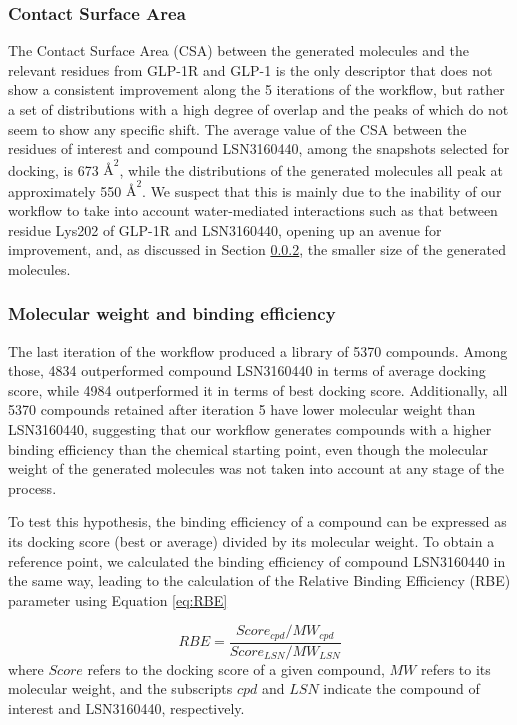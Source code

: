 \documentclass[letterpaper]{article}
\begin{document}
\subsubsection{Contact Surface Area}
The Contact Surface Area (CSA) between the generated molecules and the relevant residues from GLP-1R and GLP-1 is the only descriptor that does not show a consistent improvement along the 5 iterations of the workflow, but rather a set of distributions with a high degree of overlap and the peaks of which do not seem to show any specific shift. The average value of the CSA between the residues of interest and compound LSN3160440, among the snapshots selected for docking, is 673 $\text{\AA}^{2}$, while the distributions of the generated molecules all peak at approximately 550 $\text{\AA}^{2}$. We suspect that this is mainly due to the inability of our workflow to take into account water-mediated interactions such as that between residue Lys202 of GLP-1R and LSN3160440, opening up an avenue for improvement, and, as discussed in Section \ref{sec:results-mw}, the smaller size of the generated molecules.

\subsubsection{Molecular weight and binding efficiency}\label{sec:results-mw}
The last iteration of the workflow produced a library of 5370 compounds. Among those, 4834 outperformed compound LSN3160440 in terms of average docking score, while 4984 outperformed it in terms of best docking score. Additionally, all 5370 compounds retained after iteration 5 have lower molecular weight than LSN3160440, suggesting that our workflow generates compounds with a higher binding efficiency than the chemical starting point, even though the molecular weight of the generated molecules was not taken into account at any stage of the process. 

To test this hypothesis, the binding efficiency of a compound can be expressed as its docking score (best or average) divided by its molecular weight. To obtain a reference point, we calculated the binding efficiency of compound LSN3160440 in the same way, leading to the calculation of the Relative Binding Efficiency (RBE) parameter using Equation \ref{eq:RBE}

\begin{equation}
\label{eq:RBE}
    RBE=\frac{Score_{cpd}/MW_{cpd}}{Score_{LSN}/MW_{LSN}}
\end{equation}
where $Score$ refers to the docking score of a given compound, $MW$ refers to its molecular weight, and the subscripts $cpd$ and $LSN$ indicate the compound of interest and LSN3160440, respectively.
\end{document}
